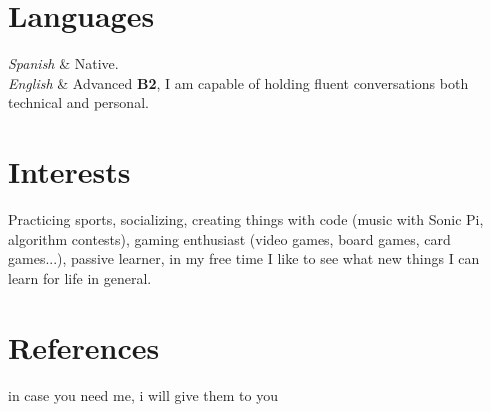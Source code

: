 \documentclass[
    changecolor={111, 156, 45}, 
]{cv-roald}
\begin{document}
\section*{Languages}
\begin{tabularcv}
\textit{Spanish}     &	Native. \\
\textit{English} & Advanced \textbf{B2}, I am capable of holding fluent conversations both technical and personal.\\
\end{tabularcv}

\section*{Interests}
Practicing sports, socializing, creating things with code (music with Sonic Pi, algorithm contests), gaming enthusiast (video games, board games, card games...), passive learner, in my free time I like to see what new things I can learn for life in general.

\section*{References}
in case you need me, i will give them to you
    
\end{document}
